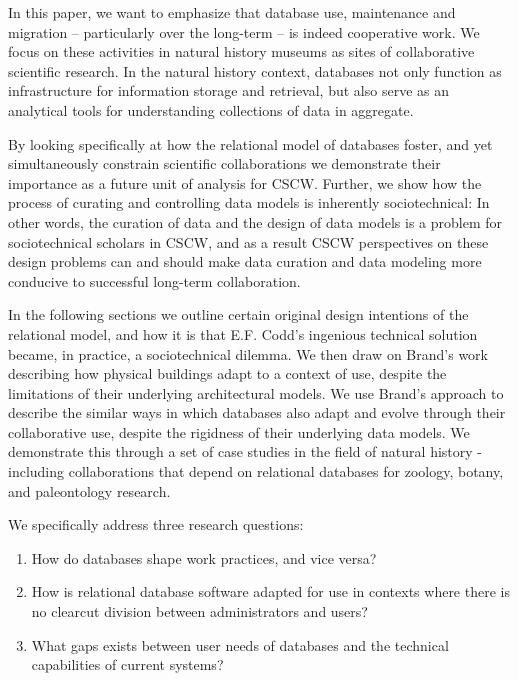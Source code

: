 In this paper, we want to emphasize that database use, maintenance and migration – particularly over the long-term – is indeed cooperative work. We focus on these activities in natural history museums as sites of collaborative scientific research. In the natural history context, databases not only function as infrastructure for information storage and retrieval, but also serve as an analytical tools for understanding collections of data in aggregate. 

By looking specifically at how the relational model of databases foster, and yet simultaneously constrain scientific collaborations we demonstrate their importance as a future unit of analysis for CSCW. Further, we show how the process of curating and controlling data models is inherently sociotechnical: In other words, the curation of data and the design of data models is a problem for sociotechnical scholars in CSCW, and as a result CSCW perspectives on these design problems can and should make data curation and data modeling more conducive to successful long-term collaboration. 

In the following sections we outline certain original design intentions of the relational model, and how it is that E.F. Codd's ingenious technical solution became, in practice, a sociotechnical dilemma. We then draw on Brand's work describing how physical buildings adapt to a context of use, despite the limitations of their underlying architectural models. We use Brand's approach to describe the similar ways in which databases also adapt and evolve through their collaborative use, despite the rigidness of their underlying data models. We demonstrate this through a set of case studies in the field of natural history - including collaborations that depend on relational databases for zoology, botany, and paleontology research.  

We specifically address three research questions: 

\begin{enumerate}
\item How do databases shape work practices, and vice versa?
\item How is relational database software adapted for use in contexts where there is no clearcut division between administrators and users?
\item What gaps exists between user needs of databases and the technical capabilities of current systems?
\end{enumerate}